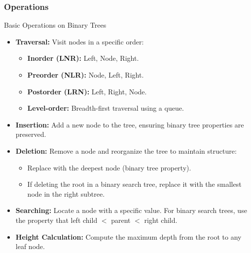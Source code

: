 \subsubsection{Operations}
\begin{properties}[]{Basic Operations on Binary Trees}
    \begin{itemize}
        \item \textbf{Traversal:} Visit nodes in a specific order:
              \begin{itemize}
                  \item \textbf{Inorder (LNR):} Left, Node, Right.
                  \item \textbf{Preorder (NLR):} Node, Left, Right.
                  \item \textbf{Postorder (LRN):} Left, Right, Node.
                  \item \textbf{Level-order:} Breadth-first traversal using a queue.
              \end{itemize}
        \item \textbf{Insertion:} Add a new node to the tree, ensuring binary tree properties are preserved.
        \item \textbf{Deletion:} Remove a node and reorganize the tree to maintain structure:
              \begin{itemize}
                  \item Replace with the deepest node (binary tree property).
                  \item If deleting the root in a binary search tree, replace it with the smallest node in the right subtree.
              \end{itemize}
        \item \textbf{Searching:} Locate a node with a specific value. For binary search trees, use the property that left child $<$ parent $<$ right child.
        \item \textbf{Height Calculation:} Compute the maximum depth from the root to any leaf node.
    \end{itemize}
\end{properties}

